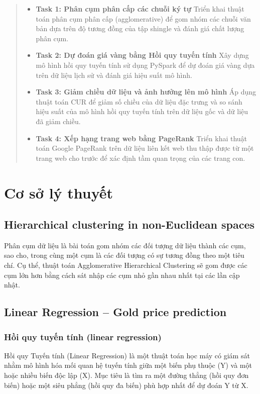 \documentclass[conference]{IEEEtran}
\begin{document}
\begin{abstract}
\begin{itemize}
    \item \textbf{Task 1: Phân cụm phân cấp các chuỗi ký tự}
    Triển khai thuật toán phân cụm phân cấp (agglomerative) để gom nhóm các chuỗi văn bản dựa trên độ tương đồng của tập shingle và đánh giá chất lượng phân cụm.

    \item \textbf{Task 2: Dự đoán giá vàng bằng Hồi quy tuyến tính}
    Xây dựng mô hình hồi quy tuyến tính sử dụng PySpark để dự đoán giá vàng dựa trên dữ liệu lịch sử và đánh giá hiệu suất mô hình.

    \item \textbf{Task 3: Giảm chiều dữ liệu và ảnh hưởng lên mô hình}
    Áp dụng thuật toán CUR để giảm số chiều của dữ liệu đặc trưng và so sánh hiệu suất của mô hình hồi quy tuyến tính trên dữ liệu gốc và dữ liệu đã giảm chiều.

    \item \textbf{Task 4: Xếp hạng trang web bằng PageRank}
    Triển khai thuật toán Google PageRank trên dữ liệu liên kết web thu thập được từ một trang web cho trước để xác định tầm quan trọng của các trang con.
\end{itemize}
\end{abstract}

\section{Cơ sở lý thuyết}

\subsection{Hierarchical clustering in non-Euclidean spaces}

Phân cụm dữ liệu là bài toán gom nhóm các đối tượng dữ liệu thành các cụm, sao cho, trong cùng một cụm là các đối tượng có sự tương đồng theo một tiêu chí. Cụ thể, thuật toán Agglomerative Hierarchical Clustering sẽ gom được các cụm lớn hơn bằng cách sát nhập các cụm nhỏ gần nhau nhất tại các lần cập nhật.

\subsection{Linear Regression – Gold price prediction}
\subsubsection{Hồi quy tuyến tính (linear regression)}
Hồi quy Tuyến tính (Linear Regression) là một thuật toán học máy có giám sát nhằm mô hình hóa mối quan hệ tuyến tính giữa một biến phụ thuộc (Y) và một hoặc nhiều biến độc lập (X). Mục tiêu là tìm ra một đường thẳng (hồi quy đơn biến) hoặc một siêu phẳng (hồi quy đa biến) phù hợp nhất để dự đoán Y từ X.
\end{document}
